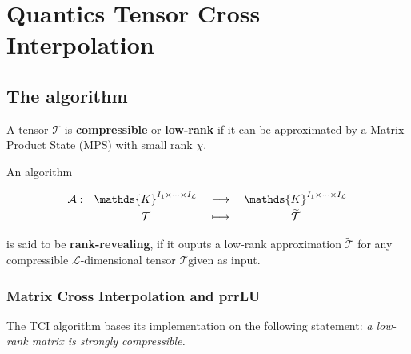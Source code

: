 \chapter{Quantics Tensor Cross Interpolation}
\label{chap:QTCI}


\section{The algorithm}

\begin{definition}
	A tensor $\mathcal{T}$ is {\normalfont \textbf{compressible}} or {\normalfont \textbf{low-rank}} if it can be approximated by a Matrix Product State (MPS) with small rank $\chi$.
	\label{def:compresstensor}
\end{definition}

\begin{definition}
	An algorithm 
	
	\[
		\renewcommand{\arraystretch}{1.1}%
		\begin{array}{r c >{{}}c<{{}} c} 
		\mathcal{A}: &
		\mathds{K}^{I_1 \times \dots \times I_\mathcal{L}} &
		\longrightarrow &
		\mathds{K}^{I_1 \times \dots \times I_\mathcal{L}} \\[2pt]
		& \mathcal{T} &
		\longmapsto &
		\widetilde{\mathcal{T}}
		\end{array}
	\]

	is said to be {\normalfont \textbf{rank-revealing}}, if it ouputs a low-rank approximation $\widetilde{\mathcal{T}}$ for any compressible $\mathcal{L}$-dimensional tensor $\mathcal{T}$\footnotemark given as input.
	\label{def:rkralg}
\end{definition}



\subsection{Matrix Cross Interpolation and prrLU}
The TCI algorithm bases its implementation on the following statement: \textit{a low-rank matrix is strongly compressible. }

